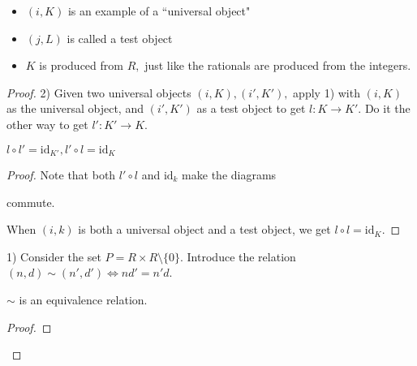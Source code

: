 \begin{rmk}

\begin{itemize}
	\item $(i,K)$ is an example of a ``universal object"
	\item $(j,L)$ is called a test object
	\item $K$ is produced from $R,$ just like the rationals are produced from the integers.
\end{itemize}

\end{rmk}
\begin{proof}

2) Given two universal objects $(i,K),(i',K'),$ apply 1) with $(i,K)$ as the universal object, and $(i',K')$ as a test object to get $l:K\rightarrow K'$. Do it the other way to get $l':K'\longrightarrow K.$

\begin{claim}

$l\circ l'=\text{id}_{K'},l'\circ l=\text{id}_K$

\begin{proof}

Note that both $l'\circ l$ and $\text{id}_k$ make the diagrams


 commute.

When $(i,k)$ is both a universal object and a test object, we get $l\circ l=\text{id}_K.$ \end{proof}
\end{claim}


1) Consider the set $P=R\times R\setminus\{0\}$. Introduce the relation $(n,d)\sim (n',d')\iff nd'=n'd$.

\begin{claim}

$\sim$ is an equivalence relation.

\begin{proof}


\end{proof}
\end{claim}
\end{proof}
